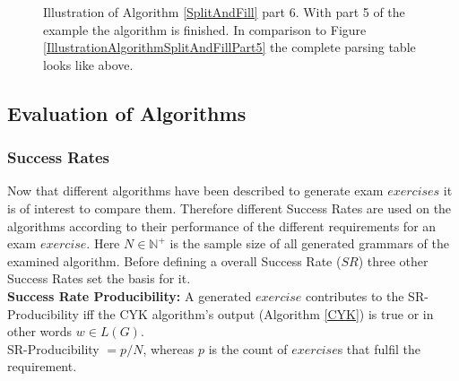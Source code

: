\begin{figure} [h]
\begin{minipage}{6in}
{
		}
	\end{minipage}
	\caption{Illustration of Algorithm \ref{SplitAndFill} part 6. With part 5 of the example the algorithm is finished. In comparison to Figure \ref{IllustrationAlgorithmSplitAndFillPart5} the complete parsing table looks like above.}
	\label{IllustrationAlgorithmSplitAndFillPart6}
\end{figure}

\clearpage
\pagebreak
\subsection{Evaluation of Algorithms} \label{AnalysisOfAlgorithms}
\subsubsection{Success Rates} \label{successRates}
\noindent Now that different algorithms have been described to generate exam $exercises$ it is of interest to compare them. Therefore different Success Rates are used on the algorithms according to their performance of the different requirements for an exam $exercise$. Here $N \in  \mathbb{N}^+$ is the sample size of all generated grammars of the examined algorithm. Before defining a overall Success Rate ($SR$) three other Success Rates set the basis for it.\\

\noindent\textbf{Success Rate Producibility: }
A generated $exercise$ contributes to the SR-Producibility iff the CYK algorithm's output (Algorithm \ref{CYK}) is true or in other words $w\in L(G)$.\\
SR-Producibility $ = p / N$, whereas $p$ is the count of $exercise$s that fulfil the requirement.\\

